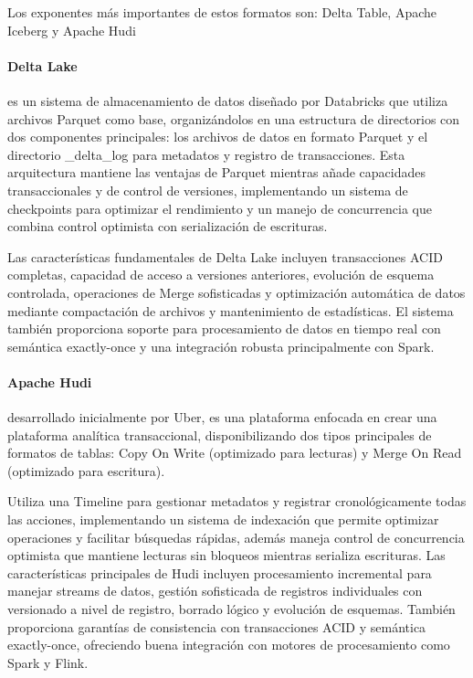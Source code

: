 Los exponentes más importantes de estos formatos son: Delta Table, Apache Iceberg y Apache Hudi

\paragraph{Delta Lake}es un sistema de almacenamiento de datos diseñado por Databricks que utiliza archivos Parquet como base, 
organizándolos en una estructura de directorios con dos componentes principales: 
los archivos de datos en formato Parquet y el directorio {\_delta\_log} para metadatos y registro de transacciones. 
Esta arquitectura mantiene las ventajas de Parquet mientras añade capacidades transaccionales y de control de versiones, 
implementando un sistema de checkpoints para optimizar el rendimiento y un manejo de concurrencia que combina control optimista 
con serialización de escrituras.

Las características fundamentales de Delta Lake incluyen transacciones ACID completas, 
capacidad de acceso a versiones anteriores, evolución de esquema controlada, 
operaciones de Merge sofisticadas y optimización automática de datos mediante compactación de archivos y mantenimiento de estadísticas. 
El sistema también proporciona soporte para procesamiento de datos en tiempo real con semántica exactly-once 
y una integración robusta principalmente con Spark.

\paragraph{Apache Hudi}desarrollado inicialmente por Uber, es una plataforma enfocada en crear una plataforma analítica transaccional,
disponibilizando dos tipos principales de formatos de tablas: 
Copy On Write (optimizado para lecturas) y Merge On Read (optimizado para escritura). 

Utiliza una Timeline para gestionar metadatos y registrar cronológicamente todas las acciones, 
implementando un sistema de indexación que permite optimizar operaciones y facilitar búsquedas rápidas, 
además maneja control de concurrencia optimista que mantiene lecturas sin bloqueos mientras serializa escrituras.
Las características principales de Hudi incluyen procesamiento incremental para manejar streams de datos, 
gestión sofisticada de registros individuales con versionado a nivel de registro, borrado lógico y evolución de esquemas.
También proporciona garantías de consistencia con transacciones ACID y semántica exactly-once, 
ofreciendo buena integración con motores de procesamiento como Spark y Flink.

